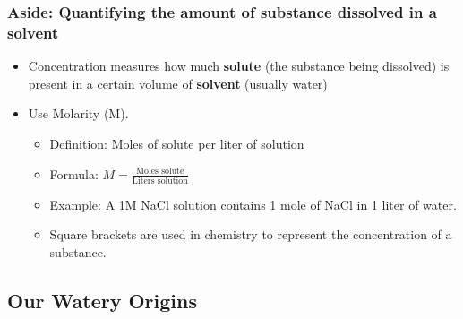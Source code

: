 \documentclass[10pt]{article}
\begin{document}
\subsubsection*{Aside: Quantifying the amount of substance dissolved in a solvent}
\begin{itemize}
    \item Concentration measures how much \textbf{solute} (the substance being dissolved) is present in a certain volume of \textbf{solvent} (usually water)
    \item Use Molarity (M).
    \begin{itemize}
        \item Definition: Moles of solute per liter of solution
        \item Formula: $M = \frac{\text{Moles solute}}{\text{Liters solution}}$
        \item Example: A 1M NaCl solution contains 1 mole of NaCl in 1 liter of water.
        \item Square brackets are used in chemistry to represent the concentration of a substance.
    \end{itemize}
\end{itemize}
\subsection*{Our Watery Origins}
\end{document}
